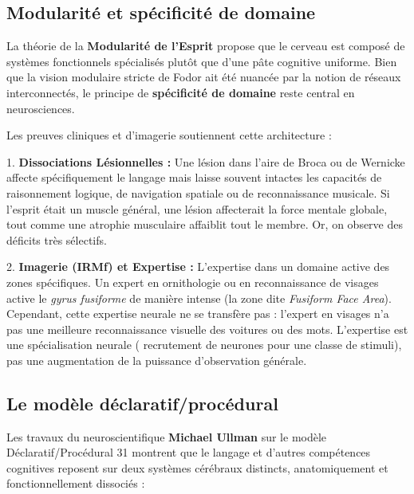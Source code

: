 \subsection{Modularité et spécificité de domaine}

La théorie de la \textbf{Modularité de l'Esprit} propose que le cerveau est composé de systèmes
fonctionnels spécialisés plutôt que d'une \og pâte\fg{} cognitive uniforme. Bien que la vision
modulaire stricte de Fodor ait été nuancée par la notion de réseaux interconnectés, le principe de
\textbf{spécificité de domaine} reste central en neurosciences.\cite{II-1-1-ref7}

Les preuves cliniques et d'imagerie soutiennent cette architecture :

1. \textbf{Dissociations Lésionnelles :} Une lésion dans l'aire de Broca ou de Wernicke affecte
spécifiquement le langage mais laisse souvent intactes les capacités de raisonnement logique, de
navigation spatiale ou de reconnaissance musicale. Si l'esprit était un muscle général, une lésion
affecterait la \og force mentale\fg{} globale, tout comme une atrophie musculaire affaiblit tout le
membre. Or, on observe des déficits très sélectifs.\cite{II-1-1-ref7}

2. \textbf{Imagerie (IRMf) et Expertise :} L'expertise dans un domaine active des zones spécifiques.
Un expert en ornithologie ou en reconnaissance de visages active le \textit{gyrus fusiforme} de
manière intense (la zone dite \textit{Fusiform Face Area}). Cependant, cette expertise neurale ne se
transfère pas : l'expert en visages n'a pas une meilleure reconnaissance visuelle des voitures ou
des mots.\cite{II-1-1-ref30} L'expertise est une spécialisation neurale ( recrutement de neurones
pour une classe de stimuli), pas une augmentation de la \og puissance d'observation\fg{} générale.



\subsection{Le modèle déclaratif/procédural}

Les travaux du neuroscientifique \textbf{Michael Ullman} sur le modèle Déclaratif/Procédural 31
montrent que le langage et d'autres compétences cognitives reposent sur deux systèmes cérébraux
distincts, anatomiquement et fonctionnellement dissociés :

